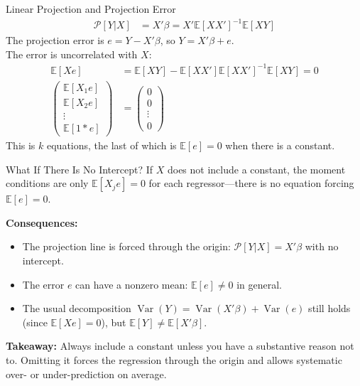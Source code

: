 \documentclass[aspectratio=169]{beamer}
\numberwithin{equation}{section}
\begin{document}
\begin{frame}{Linear Projection and Projection Error}
\begin{align*}
\mathcal{P}[Y|X]&=X'\beta=X'\mathbb{E}[XX']^{-1}\mathbb{E}[XY]
\end{align*}\pause
The projection error is $e=Y-X'\beta$, so $Y=X'\beta+e$.\\
\medskip
The error is uncorrelated with $X$:
\begin{align*}
\mathbb{E}[Xe]&=\mathbb{E}[XY]-\mathbb{E}[XX']\mathbb{E}[XX']^{-1}\mathbb{E}[XY]=0\\
\begin{pmatrix}\mathbb{E}[X_1e]\\\mathbb{E}[X_2e] \\ \vdots \\\mathbb{E}[1*e] \end{pmatrix}&=\begin{pmatrix}0\\0\\ \vdots \\ 0\end{pmatrix}
\end{align*}
This is $k$ equations, the last of which is $\mathbb{E}[e]=0$ when there is a constant.
\end{frame}

\begin{frame}{What If There Is No Intercept?}
If $X$ does not include a constant, the moment conditions are only $\mathbb{E}[X_j e]=0$ for each regressor---there is no equation forcing $\mathbb{E}[e]=0$.
\pause

\medskip
\textbf{Consequences:}
\begin{itemize}
\item The projection line is forced through the origin: $\mathcal{P}[Y|X]=X'\beta$ with no intercept.
\item The error $e$ can have a nonzero mean: $\mathbb{E}[e]\neq 0$ in general.
\pause
\item The usual decomposition $\operatorname{Var}(Y)=\operatorname{Var}(X'\beta)+\operatorname{Var}(e)$ still holds (since $\mathbb{E}[Xe]=0$), but $\mathbb{E}[Y]\neq \mathbb{E}[X'\beta]$.
\end{itemize}
\pause
\medskip
\textbf{Takeaway:} Always include a constant unless you have a substantive reason not to.  Omitting it forces the regression through the origin and allows systematic over- or under-prediction on average.
\end{frame}
\end{document}
